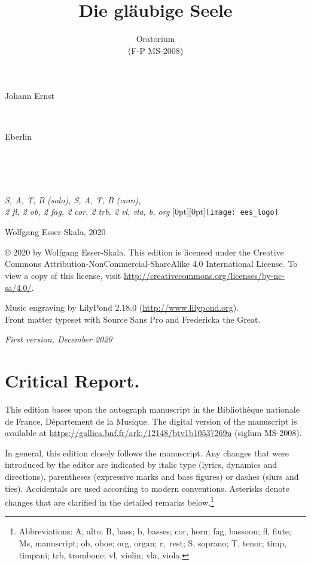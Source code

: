 \documentclass[parskip=full]{scrreprt}
\makeatletter
\DeclareRobustCommand{\sbseries}{\fontseries{sb}\selectfont}
\newcommand\fancytitlehead{
	\headingfont%
	\fontsize{80}{80}\selectfont\textcolor{black!80}{\@ifundefined{@shortname}{\@lastname}{\@shortname}.}\\[15pt]%
	\fontsize{60}{60}\selectfont\@ifundefined{@shorttitle}{\@title}{\@shorttitle}.%
}
\def\firstname#1{\def\@firstname{#1}}
\def\lastname#1{\def\@lastname{#1}}
\def\instrumentation#1{\def\@instrumentation{#1}}
\def\maketitle{%
\begin{titlepage}%
	\Large%
	{\@titlehead}%
	\vfill%
	{\strut\@firstname}\\%
	{\sbseries\color{oldred}\strut\@lastname}\\%
	{\strut\@namesuffix}%
	\vfill%
	{\sbseries\@title}\\%
	{\@subtitle}\\[\baselineskip]%
	{\itshape\@instrumentation}%
	\vfill%
	{\itshape\@parts}\hspace*{\fill}\raisebox{0pt}[0pt][0pt]{\texttt{[image: ees\_logo]}}%
\end{titlepage}%
}
\newif\ifprintreport\printreportfalse
\makeatother
\begin{document}
\frenchspacing

\titlehead{\fancytitlehead}
\firstname{Johann Ernst}
\lastname{Eberlin}
\title{Die gläubige Seele}
\subtitle{Oratorium\\(F-P MS-2008)}
\instrumentation{S, A, T, B (solo), S, A, T, B (coro),\\2 fl, 2 ob, 2 fag, 2 cor, 2 trb, 2 vl, vla, b, org}
\maketitle


\thispagestyle{empty}

\vspace*{\fill}

\hspace*{1em}Wolfgang Esser-Skala, 2020

© 2020 by Wolfgang Esser-Skala. This edition is licensed under the Creative Commons Attribution-NonCommercial-ShareAlike 4.0 International License. To view a copy of this license, visit \url{http://creativecommons.org/licenses/by-nc-sa/4.0/}.

Music engraving by LilyPond 2.18.0 (\url{http://www.lilypond.org}).\\
Front matter typeset with Source Sans Pro and Fredericka the Great.

\textit{First version, December 2020}

\vspace*{2cm}

\ifprintreport
\chapter*{Critical Report.}

This edition bases upon the autograph manuscript in the Bibliothèque nationale de France, Département de la Musique. The digital version of the manuscript is available at \url{https://gallica.bnf.fr/ark:/12148/btv1b10537269n} (siglum MS-2008).

In general, this edition closely follows the manuscript. Any changes that were introduced by the editor are indicated by italic type (lyrics, dynamics and directions), parentheses (expressive marks and bass figures) or dashes (slurs and ties). Accidentals are used according to modern conventions. Asterisks denote changes that are clarified in the detailed remarks below.\footnote{Abbreviations: A, alto; B, bass; b, basses; cor, horn; fag, bassoon; fl, flute; Ms, manuscript; ob, oboe; org, organ; r,~rest; S, soprano; T, tenor; timp, timpani; trb, trombone; vl, violin; vla, viola.}
\end{document}
